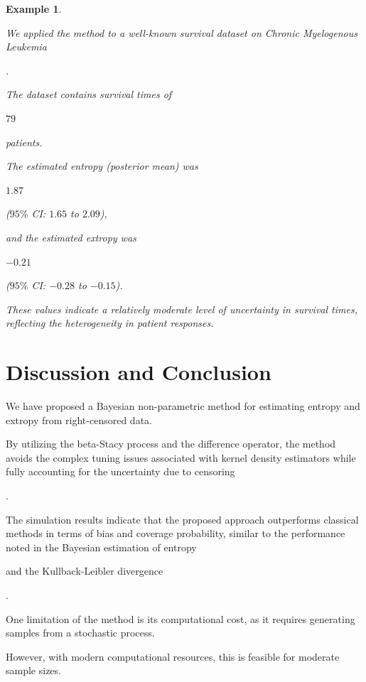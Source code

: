 \documentclass[10pt,twoside]{article}
\newtheorem{eg}[dfn]{Example}
\numberwithin{equation}{section}
\begin{document}
\begin{eg}

\label{eg2}


We applied the method to a well-known survival dataset on Chronic Myelogenous Leukemia 

\citep{8}. 

The dataset contains survival times of 

$79$ 

patients. 

The estimated entropy (posterior mean) was 

$1.87$ 

($95\%$ CI: $1.65$ to $2.09$), 

and the estimated extropy was 

$-0.21$ 

($95\%$ CI: $-0.28$ to $-0.15$). 

These values indicate a relatively moderate level of uncertainty in survival times, reflecting the heterogeneity in patient responses. 

\end{eg}



\section{Discussion and Conclusion}

We have proposed a Bayesian non-parametric method for estimating entropy and extropy from right-censored data. 

By utilizing the beta-Stacy process and the difference operator, the method avoids the complex tuning issues associated with kernel density estimators while fully accounting for the uncertainty due to censoring

\citep{9}. 

The simulation results indicate that the proposed approach outperforms classical methods in terms of bias and coverage probability, similar to the performance noted in the Bayesian estimation of entropy

\citep{2}

and the Kullback-Leibler divergence

\citep{4}. 


One limitation of the method is its computational cost, as it requires generating samples from a stochastic process. 

However, with modern computational resources, this is feasible for moderate sample sizes. 
\end{document}
